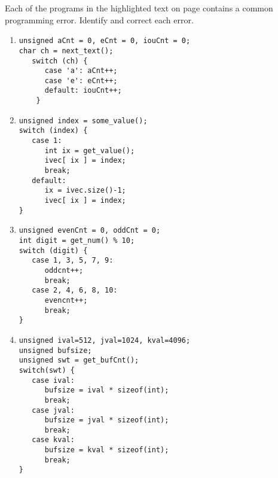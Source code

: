 \begin{question}
Each of the programs in the highlighted text on page \pageref{lst:code for exercises 5-13}
contains a common programming error. Identify and correct each error.
\begin{enumerate}[label=(\alph*)]
^^I\item
\begin{lstlisting}[label={lst:code for exercises 5-13}]
unsigned aCnt = 0, eCnt = 0, iouCnt = 0;
char ch = next_text();
   switch (ch) {
      case 'a': aCnt++;
      case 'e': eCnt++;
      default: iouCnt++;
    }
\end{lstlisting}

^^I\item
\begin{lstlisting}
unsigned index = some_value();
switch (index) {
   case 1:
      int ix = get_value();
      ivec[ ix ] = index;
      break;
   default:
      ix = ivec.size()-1;
      ivec[ ix ] = index;
}
\end{lstlisting}

^^I\item
\begin{lstlisting}
unsigned evenCnt = 0, oddCnt = 0;
int digit = get_num() % 10;
switch (digit) {
   case 1, 3, 5, 7, 9:
      oddcnt++;
      break;
   case 2, 4, 6, 8, 10:
      evencnt++;
      break;
}
\end{lstlisting}

^^I\item
\begin{lstlisting}
unsigned ival=512, jval=1024, kval=4096;
unsigned bufsize;
unsigned swt = get_bufCnt();
switch(swt) {
   case ival:
      bufsize = ival * sizeof(int);
      break;
   case jval:
      bufsize = jval * sizeof(int);
      break;
   case kval:
      bufsize = kval * sizeof(int);
      break;
}
\end{lstlisting}

\end{enumerate}
\end{question}
